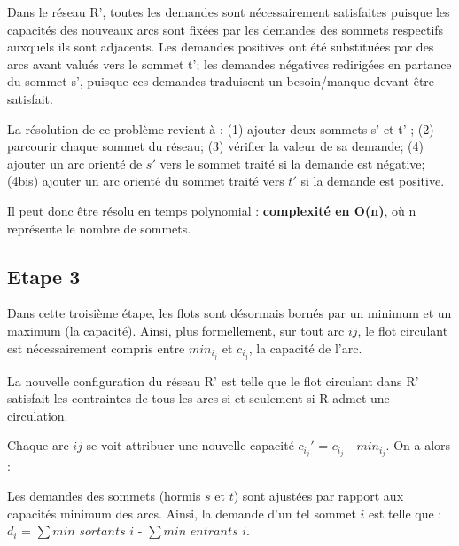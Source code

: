 \documentclass[letterpaper,12pt]{article}
\begin{document}
\hfill \break
Dans le réseau R', toutes les demandes sont nécessairement satisfaites puisque les capacités des nouveaux arcs sont fixées par les demandes des sommets respectifs auxquels ils sont adjacents. Les demandes positives ont été substituées par des arcs avant valués vers le sommet t'; les demandes négatives redirigées en partance du sommet s', puisque ces demandes traduisent un besoin/manque devant être satisfait. 

La résolution de ce problème revient à : (1) ajouter deux sommets s' et t' ; (2) parcourir chaque sommet du réseau; (3) vérifier la valeur de sa demande; (4) ajouter un arc orienté de $s'$ vers le sommet traité si la demande est négative; (4bis) ajouter un arc orienté du sommet traité vers $t'$ si la demande est positive. 

Il peut donc être résolu en temps polynomial : \textbf{complexité en O(n)}, où n représente le nombre de sommets.

\subsection{Etape 3}

Dans cette troisième étape, les flots sont désormais bornés par un minimum et un maximum (la capacité). Ainsi, plus formellement, sur tout arc $ij$, le flot circulant est nécessairement compris entre $min_i_j$ et $c_i_j$, la capacité de l'arc.

La nouvelle configuration du réseau R' est telle que le flot circulant dans R' satisfait les contraintes de tous les arcs si et seulement si R admet une circulation.

Chaque arc $ij$ se voit attribuer une nouvelle capacité $c_i_j'$ = $c_i_j$ - $min_i_j$. On a alors :
\hfill \break
\begin{center}
\end{center}

\hfill \break
Les demandes des sommets (hormis $s$ et $t$) sont ajustées par rapport aux capacités minimum des arcs. 
Ainsi, la demande d'un tel sommet $i$ est telle que :
$d_i$ = $\sum min$ $sortants$ $i$ - $\sum min$ $entrants$ $i$.
\end{document}
